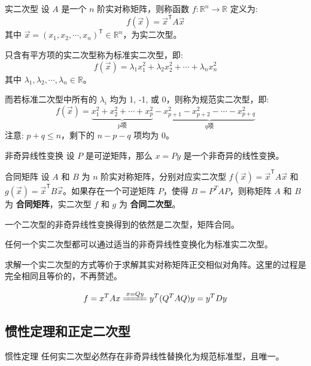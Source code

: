 \documentclass[a4paper,12pt]{ctexart}
\begin{document}
\begin{mydef}{实二次型}{}
    设 $A$ 是一个 $n$ 阶实对称矩阵，则称函数 $f: \mathbb{R}^n \to \mathbb{R}$ 定义为:
    \[
    f(\vec{x}) = \vec{x}^{\mathsf{T}} A \vec{x}
    \]
    其中 $\vec{x} = (x_1, x_2, \cdots, x_n)^{\mathsf{T}} \in \mathbb{R}^n$，为实二次型。
    
    只含有平方项的实二次型称为标准实二次型，即:
    \[
    f(\vec{x}) = \lambda_1 x_1^2 + \lambda_2 x_2^2 + \cdots + \lambda_n x_n^2
    \]
    其中 $\lambda_1, \lambda_2, \cdots, \lambda_n \in \mathbb{R}$。
    
    而若标准二次型中所有的 $\lambda_i$ 均为 1, -1, 或 0，则称为规范实二次型，即:
    \[
    f(\vec{x}) = \underbrace{x_1^2 + x_2^2 + \cdots + x_p^2}_{p\text{项}} - \underbrace{x_{p+1}^2 - x_{p+2}^2 - \cdots - x_{p+q}^2}_{q\text{项}}
    \]
    注意: $p+q \leq n$，剩下的 $n - p - q$ 项均为 0。
\end{mydef}

\begin{mydef}{非奇异线性变换}{}
    设 $P$ 是可逆矩阵，那么 $x=P y$ 是一个非奇异的线性变换。
\end{mydef}

\begin{mydef}{合同矩阵}{}
    设 $A$ 和 $B$ 为 $n$ 阶实对称矩阵，分别对应实二次型 $f(\vec{x}) = \vec{x}^{\mathsf{T}} A \vec{x}$ 和 $g(\vec{x}) = \vec{x}^{\mathsf{T}} B \vec{x}$。如果存在一个可逆矩阵 $P$，使得 $B = P^T A P$，则称矩阵 $A$ 和 $B$ 为 \textbf{合同矩阵}，实二次型 $f$ 和 $g$ 为 \textbf{合同二次型}。
\end{mydef}

\begin{mythm}{}{}
    一个二次型的非奇异线性变换得到的依然是二次型，矩阵合同。
\end{mythm}

\begin{mythm}{}{}
    任何一个实二次型都可以通过适当的非奇异线性变换化为标准实二次型。
\end{mythm}

求解一个实二次型的方式等价于求解其实对称矩阵正交相似对角阵。这里的过程是完全相同且等价的，不再赘述。

\[
f = x^T A x \xlongequal{x=Qy} y^T (Q^T A Q) y = y^T D y
\]

\subsection{惯性定理和正定二次型}

\begin{mythm}{惯性定理}{}
    任何实二次型必然存在非奇异线性替换化为规范标准型，且唯一。
\end{mythm}
\end{document}
